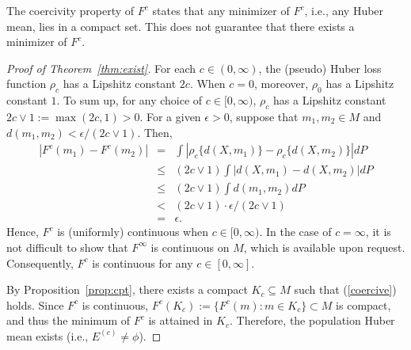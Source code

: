 \documentclass[preprint]{imsart}
\theoremstyle{plain}
\theoremstyle{remark}
\begin{document}
\begin{appendix}
The coercivity property of $F^c$ states that any minimizer of $F^{c}$, i.e., any Huber mean, lies in a compact set. This does not guarantee that there exists a minimizer of $F^{c}$.


\begin{proof}[Proof of Theorem~\ref{thm:exist}]
For each $c \in (0, \infty)$, the (pseudo) Huber loss function $\rho_{c}$ has a Lipshitz constant $2c$. When $c=0$, moreover, $\rho_{0}$ has a Lipshitz constant $1$. To sum up, for any choice of $c \in [0, \infty)$, $\rho_{c}$ has a Lipshitz constant $2c \lor 1 := \max(2c, 1)>0$. For a given $\epsilon > 0$, suppose that $m_{1}, m_{2} \in M$ and $d(m_{1}, m_{2}) < \epsilon/(2c \lor 1)$. Then, 
\begin{eqnarray*}
|F^{c}(m_1) - F^{c}(m_2)| &=& \int |\rho_{c}\{d(X, m_{1})\} - \rho_{c}\{d(X, m_{2})\}| dP \\
 &\le& (2c \lor 1) \int |d(X, m_1) - d(X, m_2)|dP \\
 &\le& (2c \lor 1) \int d(m_{1}, m_{2})dP \\
 & < & (2c \lor 1) \cdot \epsilon/(2c \lor 1) \\
 &=& \epsilon. 
\end{eqnarray*}
Hence, $F^{c}$ is (uniformly) continuous when $c \in [0, \infty)$. In the case of $c=\infty$, %
it is not difficult to show that $F^{\infty}$ is continuous on $M$, which is available upon request. Consequently, $F^{c}$ is continuous for any $c \in [0, \infty]$. 

By Proposition~\ref{prop:cpt}, there exists a compact $K_{c} \subseteq M$ such that (\ref{coercive}) holds. Since $F^{c}$ is continuous, $F^{c}(K_{c}):=\{F^{c}(m) : m \in K_{c} \} \subset M$ is compact, and thus the minimum of $F^{c}$ is attained in $K_{c}$. Therefore, the population Huber mean exists (i.e., $E^{(c)} \neq \phi$). 


\end{proof}
\end{appendix}
\end{document}
